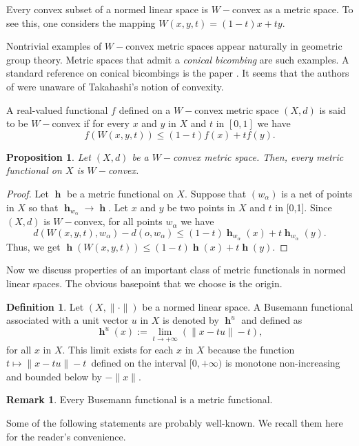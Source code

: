 \documentclass[a4paper,12pt]{article}
\newtheorem{prop}[thm]{Proposition}
\theoremstyle{definition}
\newtheorem{rem}[thm]{Remark}
\newtheorem{defn}[thm]{Definition}
\DeclareMathOperator{\h}{\mathbf{h}}
\newcommand{\norm}[1]{\lVert#1\rVert}
\numberwithin{equation}{section}
\begin{document}
Every convex subset of a normed linear space is $W-$convex as a 
metric space. To see this, one considers the mapping $W(x,y,t)=(1-t)x+ty$. 

Nontrivial examples of $W-$convex metric spaces appear naturally in
geometric group theory. Metric spaces that admit a \emph{conical bicombing} are 
such examples. A standard reference on conical bicombings is the paper
\cite{Descombes-Lang2015}. It seems that the authors of \cite{Descombes-Lang2015} 
were unaware of Takahashi's notion of convexity.

A real-valued functional $f$ defined on a $W-$convex metric space $(X,d)$ is said 
to be $W-$convex if for every $x$ and $y$ in $X$ and $t$ in $[0,1]$ we have
$$
	f(W(x,y,t)) \leq (1-t)f(x)+tf(y).
$$

\begin{prop}\label{prop:ConvexMF}
Let $(X,d)$ be a $W-$convex metric space. Then, every metric functional on $X$ is 
$W-$convex.
\end{prop}

\begin{proof}
Let $\h$ be a metric functional on $X$. Suppose that $(w_\alpha)$ is a net of 
points in $X$ so that $\h_{w_\alpha} \rightarrow \h$. Let $x$ and $y$ be two 
points in $X$ and $t$ in [0,1]. Since $(X,d)$ is $W-$convex, for all points 
$w_\alpha$ we have
$$
	d(W(x,y,t),w_\alpha) - d(o,w_\alpha) \leq (1-t)\h_{w_\alpha}(x) 
	+ t\h_{w_\alpha}(y).
$$
Thus, we get $\h(W(x,y,t)) \leq (1-t)\h(x) + t\h(y)$.
\end{proof}

Now we discuss properties of an important class of metric functionals in normed
linear spaces. The obvious basepoint that we choose is the origin.
 
\begin{defn}\label{def:Busm}
Let $(X,\norm{\cdot})$ be a normed linear space.
A Busemann functional associated with a unit vector $u$ in $X$ is denoted by 
$\h^u$ and defined as
$$
\h^u (x) := 
\lim_{t\to+\infty}(\norm{x-tu}-t),
$$
for all $x$ in $X$. This limit exists for each $x$ in $X$ because the function 
$t\mapsto\norm{x-tu} - t\,$ defined on the interval $[0,+\infty)$ is monotone 
non-increasing and bounded below by $-\norm{x}$.  
\end{defn}

\begin{rem}
Every Busemann functional is a metric functional.
\end{rem}

Some of the following statements are probably well-known. We recall them here for 
the reader's convenience.
\end{document}
